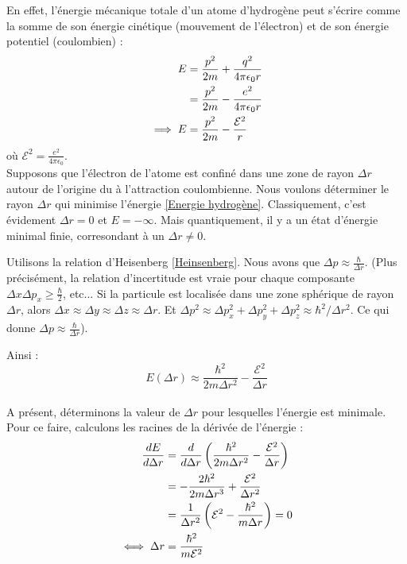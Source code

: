 \documentclass{book}
\begin{document}
En effet, l'énergie mécanique totale d'un atome d'hydrogène peut s'écrire comme la somme de son énergie cinétique (mouvement de l'électron) et de son énergie potentiel (coulombien) : 
\begin{align}
\label{Energie hydrogène}
E &= \frac{p^2}{2m} + \frac{q^2}{4\pi \epsilon_0 r} \notag \\
&= \frac{p^2}{2m} - \frac{e^2}{4 \pi \epsilon_0 r} \notag \\
\implies E &= \frac{p^2}{2m} - \frac{\mathcal{E}^2}{r}
\end{align}
où $\mathcal{E}^2 = \frac{e^2}{4 \pi \epsilon_0}$.\\

Supposons que l'électron de l'atome est confiné dans une zone de rayon $\Delta r$ autour de l'origine du à l'attraction coulombienne. Nous voulons déterminer le rayon $\Delta r$ qui minimise l'énergie \eqref{Energie hydrogène}. Classiquement, c'est évidement $\Delta r = 0$ et $E=-\infty$. Mais quantiquement, il y a un état d'énergie minimal finie, corresondant à un $\Delta r \neq 0$. 

Utilisons la relation d'Heisenberg \eqref{Heinsenberg}. Nous avons que $\Delta p \approx \frac{\hbar}{\Delta r}$. (Plus précisément, la relation d'incertitude est vraie pour chaque composante $\Delta x \Delta p_x \geq \frac{\hbar}{2}$, etc... Si la particule est localisée dans une zone sphérique de rayon $\Delta r$, alors $\Delta x \approx \Delta y \approx \Delta z \approx \Delta r$.  Et $\Delta p^2 \approx \Delta p_x^2 + \Delta p_y^2 + \Delta p_z^2 \approx \hbar^2 / \Delta r^2$. Ce qui donne $\Delta p \approx \frac{\hbar}{\Delta r}$).


Ainsi : 
\begin{equation}
\label{Energie hydrogene approx}
E(\Delta r) \approx \frac{\hbar^2}{2m \Delta r^2} - \frac{\mathcal{E}^2}{\Delta r}
\end{equation}
\paragraph{} A présent, déterminons la valeur de $\Delta r$ pour lesquelles l'énergie est minimale. Pour ce faire, calculons les racines de la dérivée de l'énergie :
\begin{align}
\label{rayon d'energie minimale}
\frac{dE}{d\Delta r} &= \frac{d}{d\Delta r} \left( \frac{\hbar^2}{2m\Delta r^2} - \frac{\mathcal{E}^2}{\Delta r} \right) \notag \\
&= - \frac{2\hbar^2}{2m\Delta r^3} + \frac{\mathcal{E}^2}{\Delta r^2} \notag \\
&= \frac{1}{\Delta r^2} \left( \mathcal{E}^2 - \frac{\hbar^2}{m \Delta r} \right) = 0 \notag \\
\iff \Delta r&= \frac{\hbar^2}{m\mathcal{E}^2}
\end{align}
\end{document}
